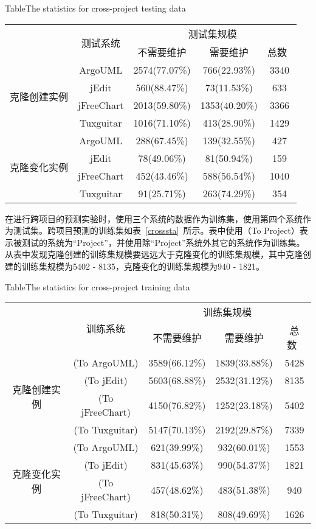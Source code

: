 \begin{table}[h]
{Table$\!$}{The statistics for cross-project testing data}
\vspace{0.5em}
\centering
\wuhao
\begin{tabular}{ccccc}
\toprule[1.5pt]
~\multirow{2}{*}{类型}&\multirow{2}{*}{测试系统}&\multicolumn{3}{c}{测试集规模}\\
\cline{3-5}
~&~&{不需要维护}&{需要维护}&{总数}~\\
\midrule[1pt]
\multirow{4}{*}{克隆创建实例}
&ArgoUML&	2574(77.07\%)&	766(22.93\%)&	3340\\
&jEdit&560(88.47\%)&	73(11.53\%)&	633\\
&jFreeChart&	2013(59.80\%)&	1353(40.20\%)&	3366\\
&Tuxguitar&	1016(71.10\%)&	413(28.90\%)&	1429\\
\hline
\multirow{4}{*}{克隆变化实例}
&ArgoUML&288(67.45\%)&139(32.55\%)&427\\
&jEdit&78(49.06\%)&81(50.94\%)&159\\
&jFreeChart&452(43.46\%)&588(56.54\%)&1040\\
&Tuxguitar&91(25.71\%)&263(74.29\%)&354\\
\bottomrule[1.5pt]
\end{tabular}
\end{table}

在进行跨项目的预测实验时，使用三个系统的数据作为训练集，使用第四个系统作为测试集。跨项目预测的训练集如表~\ref{crosssta}~所示。表中使用（To Project）表示被测试的系统为“Project”，并使用除“Project”系统外其它的系统作为训练集。从表中发现克隆创建的训练集规模要远远大于克隆变化的训练集规模，其中克隆创建的训练集规模为5402 - 8135，克隆变化的训练集规模为940 - 1821。

\begin{table}[h]
{Table$\!$}{The statistics for cross-project training data}
\vspace{0.5em}
\centering
\wuhao
\begin{tabular}{ccccc}
\toprule[1.5pt]
~\multirow{2}{*}{类型}&\multirow{2}{*}{训练系统}&\multicolumn{3}{c}{训练集规模}\\
\cline{3-5}
~&~&{不需要维护}&{需要维护}&{总数}~\\
\midrule[1pt]
\multirow{4}{*}{克隆创建实例}
&(To ArgoUML)&3589(66.12\%)&1839(33.88\%)&5428\\
&(To jEdit)&5603(68.88\%)&2532(31.12\%)&8135\\
&(To jFreeChart)&4150(76.82\%)&1252(23.18\%)&5402\\
&(To Tuxguitar)&	5147(70.13\%)&2192(29.87\%)&	7339\\
\hline
\multirow{4}{*}{克隆变化实例}
&(To ArgoUML)&621(39.99\%)&932(60.01\%)&1553\\
&(To jEdit)&831(45.63\%)&990(54.37\%)&1821\\
&(To jFreeChart)&457(48.62\%)&483(51.38\%)&940\\
&(To Tuxguitar)&	818(50.31\%)&808(49.69\%)&1626\\
\bottomrule[1.5pt]
\end{tabular}
\end{table}

